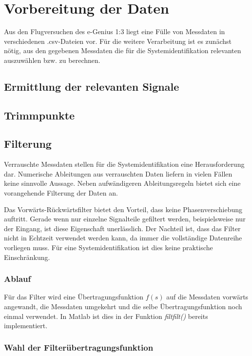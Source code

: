 \chapter{Vorbereitung der Daten}

Aus den Flugversuchen des e-Genius 1:3 liegt eine Fülle von Messdaten in verschiedenen .csv-Dateien vor. Für die weitere 
Verarbeitung ist es zunächst nötig, aus den gegebenen Messdaten die für die 
Systemidentifikation relevanten auszuwählen bzw. zu berechnen.

\section{Ermittlung der relevanten Signale} %


\section{Trimmpunkte} %


\section{Filterung} %

Verrauschte Messdaten stellen für die Systemidentifikation eine Herausforderung dar. Numerische Ableitungen aus verrauschten Daten liefern in vielen Fällen keine sinnvolle Aussage. Neben aufwändigeren Ableitungsregeln bietet sich eine vorangehende Filterung der Daten an.

Das Vorwärts-Rückwärtsfilter bietet den Vorteil, dass keine Phasenverschiebung 
auftritt. Gerade wenn nur einzelne Signalteile gefiltert werden, beispielsweise 
nur der Eingang, ist diese Eigenschaft unerlässlich. Der Nachteil ist, dass das 
Filter nicht in Echtzeit verwendet werden kann, da immer die vollständige 
Datenreihe vorliegen muss. Für eine Systemidentifikation ist dies keine 
praktische Einschränkung.

\subsection{Ablauf}

Für das Filter wird eine Übertragungsfunktion $f(s)$ auf die Messdaten vorwärts 
angewandt, die Messdaten umgekehrt und die selbe Übertragungsfunktion noch 
einmal verwendet. In Matlab ist dies in der Funktion \textit{filtfilt()} 
bereits implementiert. 

\subsection{Wahl der Filterübertragungsfunktion}

